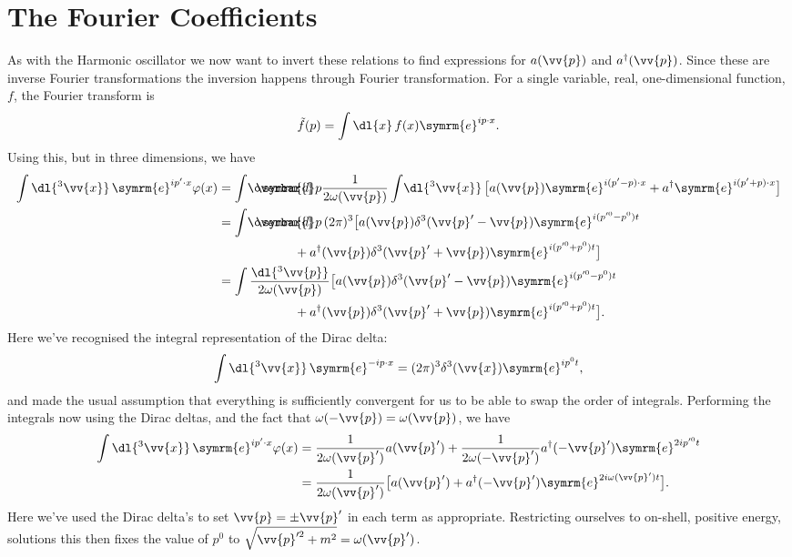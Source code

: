 \documentclass[fleqn]{NotesClass}
\newcommand{\e}{\symrm{e}}
\newcommand{\hermit}{{\dagger}}
\newcommand{\dbar}[1][0.0]{\ThisStyle{\ensurestackMath{%
            \stackengine{#1\LMex}{\SavedStyle \symrm{d}}{\SavedStyle\overbar{}%
                \mkern2.25mu}{O}{r}{F}{F}{L}}}}
\newcommand{\invariantmeasure}[1]{%
    \mathchoice{\dbar #1}{\dbar #1}{\dbar[.05] #1}{\dbar[.06] #1}
}
\begin{document}
    \section{The Fourier Coefficients}
    As with the Harmonic oscillator we now want to invert these relations to find expressions for \(a(\vv{p})\) and \(a^\hermit(\vv{p})\).
    Since these are inverse Fourier transformations the inversion happens through Fourier transformation.
    For a single variable, real, one-dimensional function, \(f\), the Fourier transform is
    \begin{equation}
        \tilde{f}(p) = \int \dl{x} \, f(x) \e^{ip \cdot x}.
    \end{equation}
    Using this, but in three dimensions, we have
    \begin{align*}
        \int \dl{^3\vv{x}} \, \e^{ip' \cdot x} \varphi(x) &= \int \! \invariantmeasure{p} \frac{1}{2\omega(\vv{p})} \int \! \dl{^3\vv{x}} \, \big[a(\vv{p}) \e^{i(p' - p) \cdot x} + a^\hermit \e^{i(p' + p)\cdot x}\big]\\
        &= \int \! \invariantmeasure{p} \, (2\pi)^3 \big[a(\vv{p}) \delta^3(\vv{p}' - \vv{p})\e^{i(p'^0 - p^0)t}\\
        &\qquad\qquad\qquad+ a^\hermit(\vv{p}) \delta^3(\vv{p}' + \vv{p})\e^{i(p'^0 + p^0)t} \big]\\
        &= \int \frac{\dl{^3\vv{p}}}{2\omega(\vv{p})} \big[a(\vv{p}) \delta^3(\vv{p}' - \vv{p})\e^{i(p'^0 - p^0)t}\\
        &\qquad\qquad\qquad+ a^\hermit(\vv{p}) \delta^3(\vv{p}' + \vv{p})\e^{i(p'^0 + p^0)t}\big].
    \end{align*}
    Here we've recognised the integral representation of the Dirac delta:
    \begin{equation}
        \int \dl{^3\vv{x}} \, \e^{-ip\cdot x} = (2\pi)^3 \delta^3(\vv{x}) \e^{ip^0t},
    \end{equation}
    and made the usual assumption that everything is sufficiently convergent for us to be able to swap the order of integrals.
    Performing the integrals now using the Dirac deltas, and the fact that \(\omega(-\vv{p}) = \omega(\vv{p})\), we have
    \begin{align}
        \int \dl{^3\vv{x}} \, \e^{ip' \cdot x} \varphi(x) &= \frac{1}{2\omega(\vv{p}')}a(\vv{p}') + \frac{1}{2\omega(-\vv{p}')} a^\hermit(-\vv{p}') \e^{2ip'^0t}\\
        &= \frac{1}{2\omega(\vv{p}')} \big[a(\vv{p}') + a^\hermit(-\vv{p}') \e^{2i\omega(\vv{p}')t}\big].
    \end{align}
    Here we've used the Dirac delta's to set \(\vv{p} = \pm\vv{p}'\) in each term as appropriate.
    Restricting ourselves to on-shell, positive energy, solutions this then fixes the value of \(p^0\) to \(\sqrt{\vv{p}'^2 + m^2} = \omega(\vv{p}')\).
    
\end{document}
